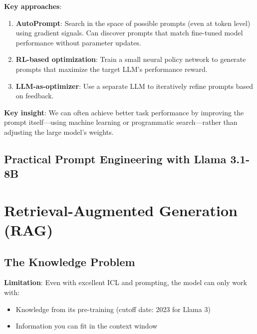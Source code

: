 \documentclass{article}
\begin{document}
\textbf{Key approaches}:

\begin{enumerate}
\item \textbf{AutoPrompt}: Search in the space of possible prompts (even at token level) using gradient signals. Can discover prompts that match fine-tuned model performance without parameter updates.

\item \textbf{RL-based optimization}: Train a small neural policy network to generate prompts that maximize the target LLM's performance reward.

\item \textbf{LLM-as-optimizer}: Use a separate LLM to iteratively refine prompts based on feedback.
\end{enumerate}

\textbf{Key insight}: We can often achieve better task performance by improving the prompt itself---using machine learning or programmatic search---rather than adjusting the large model's weights.

\subsection{Practical Prompt Engineering with Llama 3.1-8B}



\section{Retrieval-Augmented Generation (RAG)}

\subsection{The Knowledge Problem}

\textbf{Limitation}: Even with excellent ICL and prompting, the model can only work with:
\begin{itemize}
\item Knowledge from its pre-training (cutoff date: 2023 for Llama 3)
\item Information you can fit in the context window
\end{itemize}
\end{document}
